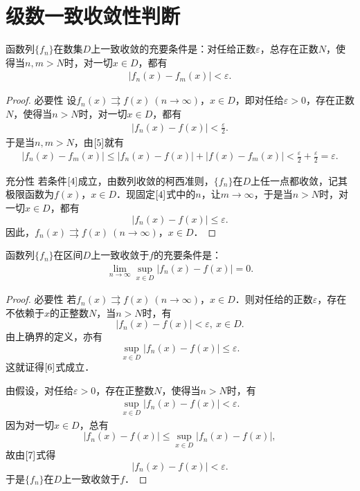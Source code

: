 \documentclass[../../main.tex]{subfiles}
\begin{document}
\section{级数一致收敛性判断}

\begin{theorem}[函数列一致收敛的柯西准则]\label{theorem:函数列一致收敛的柯西准则}
函数列\(\{f_n\}\)在数集\(D\)上一致收敛的充要条件是：对任给正数\(\varepsilon\)，总存在正数\(N\)，使得当\(n, m > N\)时，对一切\(x \in D\)，都有
\begin{align}
|f_n(x) - f_m(x)| < \varepsilon.\label{4}
\end{align}
\end{theorem}
\begin{proof}
{\heiti 必要性} 设\(f_n(x) \rightrightarrows f(x) \ (n \to \infty)\)，\(x \in D\)，即对任给\(\varepsilon > 0\)，存在正数\(N\)，使得当\(n > N\)时，对一切\(x \in D\)，都有
\begin{align}
|f_n(x) - f(x)| < \frac{\varepsilon}{2}. \label{5}
\end{align}
于是当\(n, m > N\)，由\(\eqref{5}\)就有
\begin{align*}
|f_n(x) - f_m(x)| \leqslant |f_n(x) - f(x)| + |f(x) - f_m(x)| < \frac{\varepsilon}{2} + \frac{\varepsilon}{2} = \varepsilon.
\end{align*}

{\heiti 充分性} 若条件\(\eqref{4}\)成立，由数列收敛的柯西准则，\(\{f_n\}\)在\(D\)上任一点都收敛，记其极限函数为\(f(x)\)，\(x \in D\)．现固定\(\eqref{4}\)式中的\(n\)，让\(m \to \infty\)，于是当\(n > N\)时，对一切\(x \in D\)，都有
\[
|f_n(x) - f(x)| \leqslant \varepsilon.
\]
因此，\(f_n(x) \rightrightarrows f(x) \ (n \to \infty)\)，\(x \in D\)．

\end{proof} 

\begin{theorem}
函数列\(\{f_n\}\)在区间\(D\)上一致收敛于\(f\)的充要条件是：
\begin{align}
\lim_{n \to \infty} \sup_{x \in D} |f_n(x) - f(x)| = 0. \label{6}
\end{align}
\end{theorem} 
\begin{proof}
{\heiti 必要性} 若\(f_n(x) \rightrightarrows f(x) \ (n \to \infty)\)，\(x \in D\)．则对任给的正数\(\varepsilon\)，存在不依赖于\(x\)的正整数\(N\)，当\(n > N\)时，有
\[
|f_n(x) - f(x)| < \varepsilon, \ x \in D.
\]
由上确界的定义，亦有
\[
\sup_{x \in D} |f_n(x) - f(x)| \leqslant \varepsilon.
\]
这就证得\(\eqref{6}\)式成立．

 由假设，对任给\(\varepsilon > 0\)，存在正整数\(N\)，使得当\(n > N\)时，有
\begin{align}
\sup_{x \in D} |f_n(x) - f(x)| < \varepsilon. \label{7}
\end{align}
因为对一切\(x \in D\)，总有
\[
|f_n(x) - f(x)| \leqslant \sup_{x \in D} |f_n(x) - f(x)|,
\]
故由\(\eqref{7}\)式得
\[
|f_n(x) - f(x)| < \varepsilon.
\]
于是\(\{f_n\}\)在\(D\)上一致收敛于\(f\)．

\end{proof}
\end{document}
